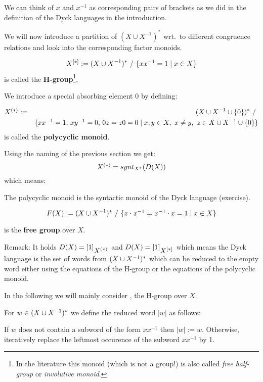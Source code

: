 We can think of $x$ and $x^{-1}$ as corresponding pairs of
brackets as we did in the definition of the Dyck languages in the introduction.

We will now introduce a partition of $(X \cup X^{-1})^*$ wrt.\ to
different congruence relations and look into the corresponding factor monoids.

\begin{definition}
\[ \hgroup{X} := (\unioninv{X})^*\ /\ \setof{x x^{-1} = 1 \mid x \in X} \] is
called the {\bf H-group}\footnote{In the literature this monoid (which is not a
group!) is also called {\em free half-group} or {\em involutive monoid}.}.
\end{definition}

We introduce a special absorbing element $0$ by defining:
\begin{definition}
\begin{eqnarray*}
\mbox{${X}^{(*)}$} & := & (X \cup {X}^{-1} \cup \mbox{$\{0\}$})^*\ /\ \\
& & \mbox{$\{x x^{-1} = 1,\,x y^{-1} = 0,\,0 z = z 0 = 0 \mid x,y \in X,\ x\neq
y,\ z \in X \cup {X}^{-1} \cup \mbox{$\{0\}$}\}$}
\end{eqnarray*}
is called the {\bf polycyclic monoid}.
\end{definition}

Using the naming of the previous section we get:
\[ \mbox{${X}^{(*)}$} = synt_{X^*}(D(X)) \]
which means:

The polycyclic monoid is the syntactic monoid of the Dyck language (exercise).

\begin{definition}
\[ F(X) := (X \cup {X}^{-1})^*\ /\ \mbox{$\{x \cdot x^{-1} = x^{-1} \cdot x = 1 \mid
x \in X\}$} \]
\end{definition}
is the {\bf free group} over $X$.

\label{dyck-language}
Remark: It holds $D(X) = [1]_{\mbox{${X}^{(*)}$}}$ and $D(X) = [1]_{\mbox{${X}^{[*]}$}}$ which
means the Dyck language is the set of words from $(X \cup {X}^{-1})^*$ which can be
reduced to the empty word either using the equations of the H-group or the
equations of the polycyclic monoid.

In the following we will mainly consider , the H-group over $X$.

For $w \in (X \cup {X}^{-1})^*$ we define the reduced word $|w|$ as follows: 

If $w$ does not contain a subword of the form $x x^{-1}$ then $|w| := w$.
Otherwise, iteratively replace the leftmost occurence of the subword $x
x^{-1}$ by 1.

